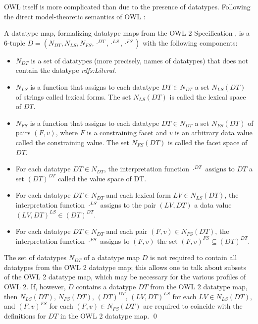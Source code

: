 \documentclass[10pt,fleqn,final]{scrreprt}
\newcommand{\cbs}[0]{\color{red}\xspace} %
\newenvironment{definitions}[0]{\medskip }{}
\begin{document}
\begin{definitions}
\cbs
OWL itself is more complicated than \SROIQ due to the presence of datatypes.
Following the direct model-theoretic semantics of OWL \cite{w3c:owl2-direct-semantics}:

\begin{definition}
A datatype map, formalizing datatype maps from the OWL 2 Specification \cite{w3c:owl2-spec}, is a 6-tuple $D = ( N_{DT} , N_{LS} , N_{FS} , \cdot^{DT} , \cdot^{LS} , \cdot^{FS} )$ with the following components:
\begin{itemize}
\item
    $N_{DT}$ is a set of datatypes (more precisely, names of datatypes) that does not contain the datatype \textit{rdfs:Literal}.
\item
    $N_{LS}$ is a function that assigns to each datatype $DT \in N_{DT}$ a set $N_{LS}(DT)$ of strings called lexical forms. The set $N_{LS}(DT)$ is called the lexical space of $DT$.
\item
    $N_{FS}$ is a function that assigns to each datatype $DT \in N_{DT}$ a set $N_{FS}(DT)$ of pairs $( F , v )$, where $F$ is a constraining facet and $v$ is an arbitrary data value called the constraining value. The set $N_{FS}(DT)$ is called the facet space of $DT$.
\item
    For each datatype $DT \in N_{DT}$, the interpretation function $\cdot^{DT}$ assigns to $DT$ a set $(DT)^{DT}$ called the value space of DT.
\item
    For each datatype $DT \in N_{DT}$ and each lexical form $LV \in N_{LS}(DT)$, the interpretation function $\cdot^{LS}$ assigns to the pair $( LV , DT )$ a data value $( LV , DT )^{LS} \in (DT)^{DT}$.
\item
    For each datatype $DT \in N_{DT}$ and each pair $( F , v ) \in N_{FS}(DT)$, the interpretation function $\cdot^{FS}$ assigns to $( F , v )$ the set $( F , v )^{FS}\subseteq(DT)^{DT}$. 
\end{itemize}

The set of datatypes $N_{DT}$ of a datatype map $D$ is not required to contain all datatypes from the OWL 2 datatype map; this allows one to talk about subsets of the OWL 2 datatype map, which may be necessary for the various profiles of OWL 2. If, however, $D$ contains a datatype $DT$ from the OWL 2 datatype map, then $N_{LS}(DT)$, $N_{FS}(DT)$, $(DT)^{DT}$, $( LV , DT )^{LS}$ for each $LV \in N_{LS}(DT)$, and $( F , v )^{FS}$ for each $( F , v ) \in N_{FS}(DT)$ are required to coincide with the definitions for $DT$ in the OWL 2 datatype map.
\qed\end{definition}


\end{definitions}
\end{document}
